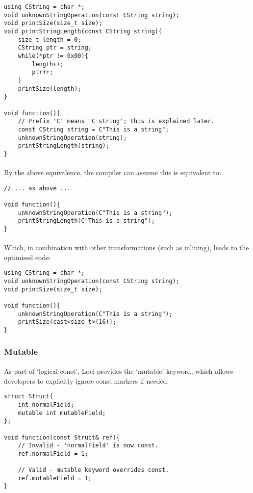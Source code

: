 \documentclass[12pt,twoside,notitlepage]{report}
\begin{document}
\begin{lstlisting}
using CString = char *;
void unknownStringOperation(const CString string);
void printSize(size_t size);
void printStringLength(const CString string){
	size_t length = 0;
	CString ptr = string;
	while(*ptr != 0x00){
		length++;
		ptr++;
	}
	printSize(length);
}

void function(){
	// Prefix 'C' means 'C string'; this is explained later.
	const CString string = C"This is a string";
	unknownStringOperation(string);
	printStringLength(string);
}
\end{lstlisting}

\paragraph{}
By the above equivalence, the compiler can assume this is equivalent to:

\begin{lstlisting}
// ... as above ...

void function(){
	unknownStringOperation(C"This is a string");
	printStringLength(C"This is a string");
}
\end{lstlisting}

\paragraph{}
Which, in combination with other transformations (such as inlining), leads to the optimised code:

\begin{lstlisting}
using CString = char *;
void unknownStringOperation(const CString string);
void printSize(size_t size);

void function(){
	unknownStringOperation(C"This is a string");
	printSize(cast<size_t>(16));
}
\end{lstlisting}

\subsubsection{Mutable}

\paragraph{}
As part of `logical const', Loci provides the `mutable' keyword, which allows developers to explicitly ignore const markers if needed:

\begin{lstlisting}
struct Struct{
	int normalField;
	mutable int mutableField;
};

void function(const Struct& ref){
	// Invalid - 'normalField' is now const.
	ref.normalField = 1;
	
	// Valid - mutable keyword overrides const.
	ref.mutableField = 1;
}
\end{lstlisting}
\end{document}
